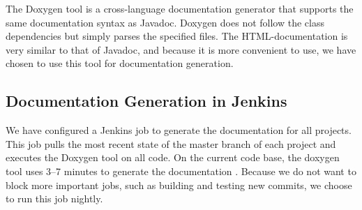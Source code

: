 The Doxygen tool is a cross-language documentation generator that supports the same documentation syntax as Javadoc. Doxygen does not follow the class dependencies but simply parses the specified files. The HTML-documentation is very similar to that of Javadoc, and because it is more convenient to use, we have chosen to use this tool for documentation generation.

\subsection{Documentation Generation in Jenkins}
We have configured a Jenkins job to generate the documentation for all projects. This job pulls the most recent state of the master branch of each project and executes the Doxygen tool on all code. On the current code base, the doxygen tool uses 3--7 minutes to generate the documentation . Because we do not want to block more important jobs, such as building and testing new commits, we choose to run this job nightly.

